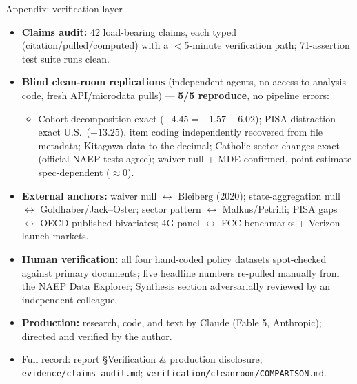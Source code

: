 \documentclass[11pt,aspectratio=169]{beamer}
\begin{document}
\appendix
\begin{frame}[shrink=10]{Appendix: verification layer}
\begin{itemize}
\item \textbf{Claims audit:} 42 load-bearing claims, each typed (citation/pulled/computed) with a $<$5-minute verification path; 71-assertion test suite runs clean.
\item \textbf{Blind clean-room replications} (independent agents, no access to analysis code, fresh API/microdata pulls) --- \textbf{5/5 reproduce}, no pipeline errors:
  \begin{itemize}
  \item Cohort decomposition exact ($-4.45 = +1.57 - 6.02$); PISA distraction exact U.S.\ ($-13.25$), item coding independently recovered from file metadata; Kitagawa data to the decimal; Catholic-sector changes exact (official NAEP tests agree); waiver null + MDE confirmed, point estimate spec-dependent ($\approx$0).
  \end{itemize}
\item \textbf{External anchors:} waiver null $\leftrightarrow$ Bleiberg (2020); state-aggregation null $\leftrightarrow$ Goldhaber/Jack--Oster; sector pattern $\leftrightarrow$ Malkus/Petrilli; PISA gaps $\leftrightarrow$ OECD published bivariates; 4G panel $\leftrightarrow$ FCC benchmarks + Verizon launch markets.
\item \textbf{Human verification:} all four hand-coded policy datasets spot-checked against primary documents; five headline numbers re-pulled manually from the NAEP Data Explorer; Synthesis section adversarially reviewed by an independent colleague.
\item \textbf{Production:} research, code, and text by Claude (Fable 5, Anthropic); directed and verified by the author.
\item Full record: report \S Verification \& production disclosure; \texttt{evidence/claims\_audit.md}; \texttt{verification/cleanroom/COMPARISON.md}.
\end{itemize}
\end{frame}
\end{document}
